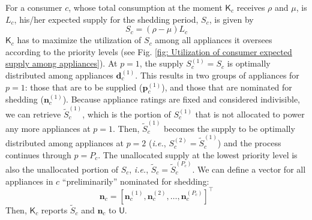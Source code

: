\documentclass[journal, a4paper]{IEEEtran}
\begin{document}
For a consumer $c$, whose total consumption at the moment $\mathsf{K}_{c}$ receives $\rho$ and $\mu$, is $L_{c}$,
his/her expected supply for the shedding period, $S_{c}$, is given by
\begin{equation}
	\label{eqn: Consumer expected supply}
	S_{c} = \left( \rho - \mu \right) L_{c}
\end{equation}
$\mathsf{K}_{c}$ has to maximize the utilization of $S_{c}$ among all appliances it oversees
according to the priority levels (see Fig. \ref{fig: Utilization of consumer expected supply among appliances}).
At $p=1$, the supply $S_{c}^{\left(1\right)} = S_{c}$ is optimally distributed among appliances $\mathbf{d}_{c}^{\left(1\right)}$.
This results in two groups of appliances for $p=1$:
those that are to be supplied ($\mathbf{p}_{c}^{\left(1\right)}$),
and those that are nominated for shedding ($\mathbf{n}_{c}^{\left(1\right)}$).
Because appliance ratings are fixed and considered indivisible, we can retrieve $\tilde{S}_{c}^{\left(1\right)}$,
which is the portion of $S_{c}^{\left(1\right)}$ that is not allocated to power any more appliances at $p=1$.
Then, $\tilde{S}_{c}^{\left(1\right)}$ becomes the supply to be optimally distributed among appliances at $p=2$
(\textit{i.e.},
$S_{c}^{\left(2\right)} = \tilde{S}_{c}^{\left(1\right)}$)
and the process continues through $p=P_{c}$.
The unallocated supply at the lowest priority level is also the unallocated portion of $S_{c}$,
\textit{i.e.}, $\tilde{S}_{c} = \tilde{S}_{c}^{\left(P_{c}\right)}$.
We can define a vector for all appliances in $c$ ``preliminarily'' nominated for shedding:
\begin{equation}
	\label{eqn: Appliances preliminarily nominated for shedding by a consumer}
	\mathbf{n}_{c} = \left[ \mathbf{n}_{c}^{\left(1\right)}, \mathbf{n}_{c}^{\left(2\right)}, \ldots, \mathbf{n}_{c}^{\left(P_{c}\right)} \right]^{\intercal}
\end{equation}
Then, $\mathsf{K}_{c}$ reports $\tilde{S}_{c}$ and $\mathbf{n}_{c}$ to $\mathsf{U}$.
\end{document}
